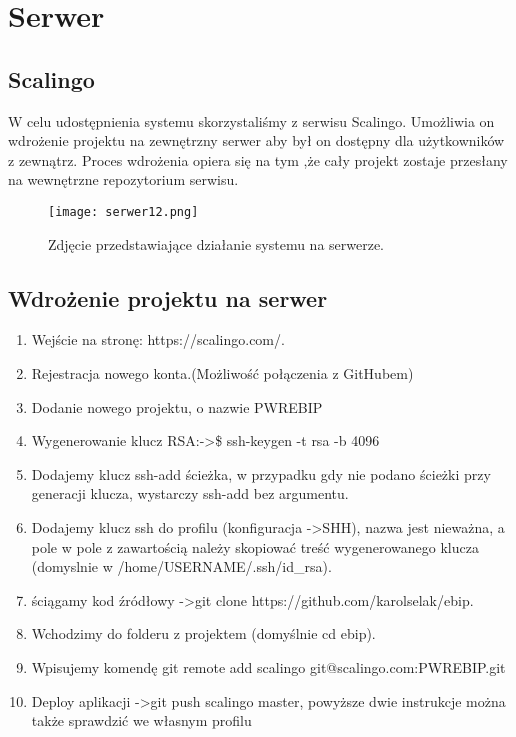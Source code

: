 \documentclass{article}
\begin{document}
\newpage

\section{Serwer}
\subsection{Scalingo}
	W celu udostępnienia systemu skorzystaliśmy z serwisu Scalingo. Umożliwia on wdrożenie projektu na zewnętrzny serwer aby był on dostępny dla użytkowników z zewnątrz. Proces wdrożenia opiera się na tym ,że cały projekt zostaje przesłany na wewnętrzne repozytorium serwisu.
	
	\begin{figure}[h!]
		\texttt{[image: serwer12.png]}
		\centering
		\caption{Zdjęcie przedstawiające działanie systemu na serwerze.}
	\end{figure}
	
\subsection{Wdrożenie projektu na serwer}
\begin{enumerate}
	\item Wejście na stronę: https://scalingo.com/.
	\item Rejestracja nowego konta.(Możliwość połączenia z GitHubem)
	\item Dodanie nowego projektu, o nazwie PWREBIP
	\item Wygenerowanie klucz RSA:-\textgreater \$ ssh-keygen -t rsa -b 4096
	\item Dodajemy klucz ssh-add ścieżka, w przypadku gdy nie podano ścieżki przy generacji klucza, wystarczy ssh-add bez argumentu.
	\item Dodajemy klucz ssh do profilu (konfiguracja -\textgreater SHH), nazwa jest nieważna, a pole w pole z zawartością należy skopiować treść wygenerowanego klucza (domyslnie w /home/USERNAME/.ssh/id\_rsa).
	\item ściągamy kod źródłowy -\textgreater git clone https://github.com/karolselak/ebip.
	\item Wchodzimy do folderu z projektem (domyślnie cd ebip).
	\item Wpisujemy komendę git remote add scalingo git@scalingo.com:PWREBIP.git
	\item Deploy aplikacji -\textgreater git push scalingo master, powyższe dwie instrukcje można także sprawdzić we własnym profilu
	
\end{enumerate}
\end{document}
